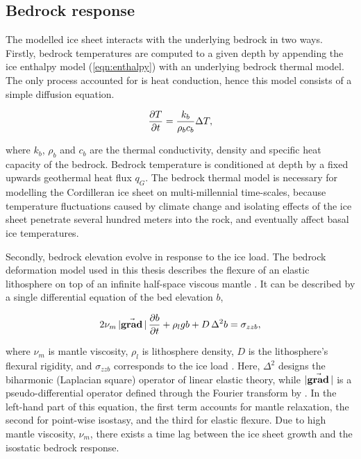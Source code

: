 \documentclass{article}
\newcommand{\vect}[1]{\va*{#1}} %
\renewcommand{\grad}[1]{\vect{\mathrm{grad}}\,#1}   %
\begin{document}
\subsection{Bedrock response}

The modelled ice sheet interacts with the underlying bedrock in two ways.
Firstly, bedrock temperatures are computed to a given depth by appending the
ice enthalpy model (\ref{eqn:enthalpy}) with an underlying bedrock thermal
model. The only process accounted for is heat conduction, hence this model
consists of a simple diffusion equation.

\begin{equation}
    \pdv{T}{t} = \frac{k_b}{\rho_b c_b} \Delta T,
\end{equation}

where $k_b$, $\rho_b$ and $c_b$ are the thermal conductivity, density and
specific heat capacity of the bedrock. Bedrock temperature is conditioned at
depth by a fixed upwards geothermal heat flux $q_G$. The bedrock thermal model
is necessary for modelling the Cordilleran ice sheet on multi-millennial
time-scales, because temperature fluctuations caused by climate change and
isolating effects of the ice sheet penetrate several hundred meters into the
rock, and eventually affect basal ice temperatures.

Secondly, bedrock elevation evolve in response to the ice load. The bedrock
deformation model used in this thesis describes the flexure of an elastic
lithosphere on top of an infinite half-space viscous mantle
\citep{Lingle.Clark.1985}. It can be described by a single differential
equation of the bed elevation $b$,

\begin{equation}
    2\nu_m\,|\grad|\,\pdv{b}{t} + \rho_l g b + D\,\Delta^2 b = \sigma_{zzb},
\end{equation}

where $\nu_m$ is mantle viscosity, $\rho_l$ is lithosphere density, $D$ is the
lithosphere's flexural rigidity, and $\sigma_{zzb}$ corresponds to the ice load
\citep{Bueler.etal.2007}. Here, $\Delta^2$ designs the biharmonic (Laplacian
square) operator of
linear elastic theory, while $|\grad|$ is a pseudo-differential operator
defined through the Fourier transform by \citet[Eq.~6]{Bueler.etal.2007}. In
the left-hand part of this equation, the first term accounts for mantle
relaxation, the second for point-wise isostasy, and the third for elastic
flexure. Due to high mantle viscosity, $\nu_m$, there exists a time lag between
the ice sheet growth and the isostatic bedrock response.
\end{document}
